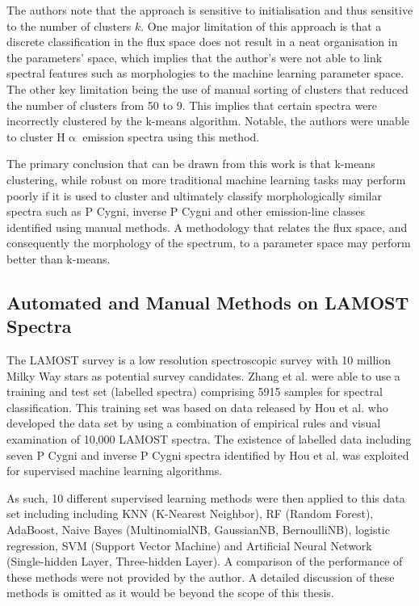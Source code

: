 The authors note that the approach is sensitive to initialisation and thus sensitive to the number of clusters $k$. One major limitation of this approach is that a discrete classification in the flux space does not result in a neat organisation in the parameters' space, which implies that the author's were not able to link spectral features such as morphologies to the machine learning parameter space. The other key limitation being the use of manual sorting of clusters that reduced the number of clusters from 50 to 9. This implies that certain spectra were incorrectly clustered by the k-means algorithm. Notable, the authors were unable to cluster H$\upalpha$ emission spectra using this method. 

The primary conclusion that can be drawn from this work is that k-means clustering, while robust on more traditional machine learning tasks may perform poorly if it is used to cluster and ultimately classify morphologically similar spectra such as P Cygni, inverse P Cygni and other emission-line classes identified using manual methods. A methodology that relates the flux space, and consequently the morphology of the spectrum, to a parameter space may perform better than k-means. 

\subsection{Automated and Manual Methods on LAMOST Spectra}

The LAMOST survey is a low resolution spectroscopic survey with 10 million Milky Way stars as potential survey candidates. Zhang et al. were able to use a training and test set (labelled spectra) comprising 5915 samples for spectral classification. This training set was based on data released by Hou et al.\cite{hou2016catalog} who developed the data set by using a combination of empirical rules and visual examination of 10,000 LAMOST spectra. The existence of labelled data including seven P Cygni and inverse P Cygni spectra identified by Hou et al. was exploited for supervised machine learning algorithms. 

As such, 10 different supervised learning methods were then applied to this data set including including KNN (K-Nearest Neighbor), RF (Random Forest), AdaBoost, Naive Bayes (MultinomialNB, GaussianNB, BernoulliNB), logistic regression, SVM (Support Vector Machine) and Artificial Neural Network (Single-hidden Layer, Three-hidden Layer)\cite{zhang2021catalog}. A comparison of the performance of these methods were not provided by the author. A detailed discussion of these methods is omitted as it would be beyond the scope of this thesis. 

